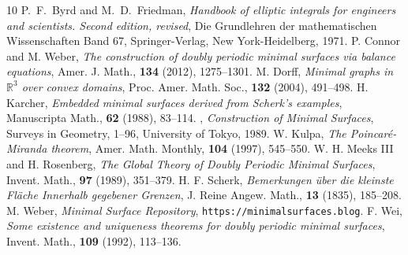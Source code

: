 \documentclass[11pt]{amsart}
\numberwithin{equation}{section}
\numberwithin{figure}{section}
\theoremstyle{plain} %
\theoremstyle{definition} %
\begin{document}
%
%
%

\begin{thebibliography}{10}
%
 P.~F.~Byrd and M.~D.~Friedman, 
\textit{Handbook of elliptic integrals for engineers and scientists. 
Second edition, revised},
Die Grundlehren der mathematischen Wissenschaften Band 67, 
Springer-Verlag, New York-Heidelberg, 1971.
%
%
 P. Connor and M. Weber,
\textit{The construction of doubly periodic minimal surfaces via balance equations}, 
Amer. J. Math., \textbf{134} (2012), 1275--1301.
%
 M. Dorff, 
\textit{Minimal graphs in $\mathbb{R}^3$ over convex domains},
Proc. Amer. Math. Soc., \textbf{132} (2004), 491--498.
%
%
 H. Karcher, 
\textit{Embedded minimal surfaces derived from Scherk's examples},
Manuscripta Math., \textbf{62} (1988), 83--114.
%
 \bysame, %
\textit{Construction of Minimal Surfaces},
Surveys in Geometry, 1--96, University of Tokyo, 1989.
%
 W. Kulpa, 
\textit{The Poincar\'e-Miranda theorem},
Amer. Math. Monthly, \textbf{104} (1997), 545--550.
%
 W. H. Meeks III and H. Rosenberg, 
\textit{The Global Theory of Doubly Periodic Minimal Surfaces},
Invent. Math., \textbf{97} (1989), 351--379.
%
%
 H. F. Scherk, 
\textit{Bemerkungen \"{u}ber die kleinste {F}l\"{a}che {I}nnerhalb gegebener {G}renzen},
J. Reine Angew. Math., \textbf{13} (1835), 185--208.
%
 M. Weber, 
\textit{Minimal Surface Repository},
\texttt{https://minimalsurfaces.blog}.
%
%
 F. Wei, 
\textit{Some existence and uniqueness theorems for doubly periodic minimal surfaces},
Invent. Math., \textbf{109} (1992), 113--136.
\end{thebibliography}
%
\end{document}
